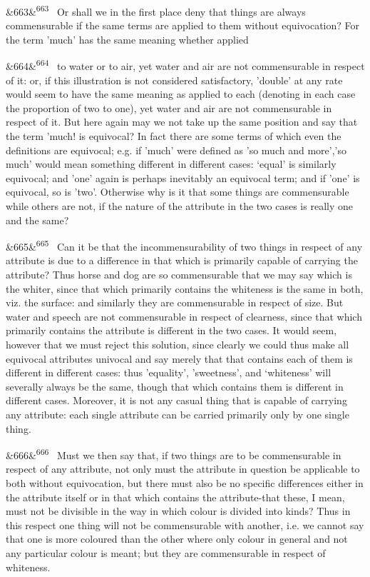 \documentclass[12pt]{article}
\newcommand{\para}[1][]{\par\noindent\ifx&#1&\else\textsuperscript{\footnotesize #1}~\fi}
\begin{document}
\para[663] Or shall we in the first place deny that things are always commensurable if the same terms are applied to them without equivocation? For the term 'much' has the same meaning whether applied

\para[664] to water or to air, yet water and air are not commensurable in respect of it: or, if this illustration is not considered satisfactory, 'double' at any rate would seem to have the same meaning as applied to each (denoting in each case the proportion of two to one), yet water and air are not commensurable in respect of it. But here again may we not take up the same position and say that the term 'much! is equivocal? In fact there are some terms of which even the definitions are equivocal; e.g. if 'much' were defined as 'so much and more','so much' would mean something different in different cases: ‘equal’ is similarly equivocal; and 'one' again is perhaps inevitably an equivocal term; and if 'one' is equivocal, so is 'two'. Otherwise why is it that some things are commensurable while others are not, if the nature of the attribute in the two cases is really one and the same?

\para[665] Can it be that the incommensurability of two things in respect of any attribute is due to a difference in that which is primarily capable of carrying the attribute? Thus horse and dog are so commensurable that we may say which is the whiter, since that which primarily contains the whiteness is the same in both, viz. the surface: and similarly they are commensurable in respect of size. But water and speech are not commensurable in respect of clearness, since that which primarily contains the attribute is different in the two cases. It would seem, however that we must reject this solution, since clearly we could thus make all equivocal attributes univocal and say merely that that contains each of them is different in different cases: thus 'equality', 'sweetness', and ‘whiteness’ will severally always be the same, though that which contains them is different in different cases. Moreover, it is not any casual thing that is capable of carrying any attribute: each single attribute can be carried primarily only by one single thing.

\para[666] Must we then say that, if two things are to be commensurable in respect of any attribute, not only must the attribute in question be applicable to both without equivocation, but there must also be no specific differences either in the attribute itself or in that which contains the attribute-that these, I mean, must not be divisible in the way in which colour is divided into kinds? Thus in this respect one thing will not be commensurable with another, i.e. we cannot say that one is more coloured than the other where only colour in general and not any particular colour is meant; but they are commensurable in respect of whiteness.
\end{document}
